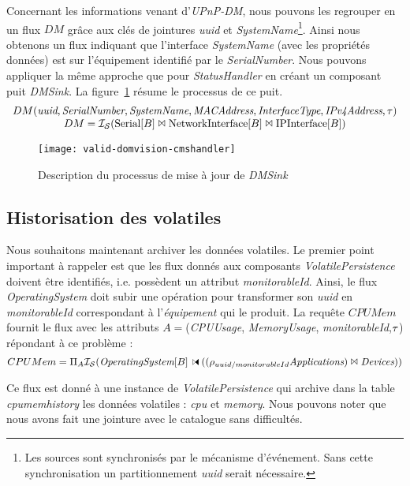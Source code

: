 Concernant les informations venant d'\textit{UPnP-DM}, nous pouvons les regrouper en un flux $DM$ grâce aux clés de jointures \textit{uuid} et \textit{SystemName}\footnote{Les sources sont synchronisés par le mécanisme d'événement. Sans cette synchronisation un partitionnement \textit{uuid} serait nécessaire.}. Ainsi nous obtenons un flux indiquant que l'interface \textit{SystemName} (avec les propriétés données) est sur l'équipement identifié par le \textit{SerialNumber}. Nous pouvons appliquer la même approche que pour \textit{StatusHandler} en créant un composant puit \textit{DMSink}. La figure~\ref{fig:valid:domvision:cmshandler} résume le processus de ce puit.
$$\begin{array}{c} DM(\textit{uuid},\textit{SerialNumber},\textit{SystemName},\textit{MACAddress},\textit{InterfaceType}, \textit{IPv4Address}, \tau)\\
 DM = \mathcal{I_S}(\textrm{Serial}[B] \Join \textrm{NetworkInterface}[B] \Join \textrm{IPInterface}[B])\end{array}$$
\begin{figure}[ht]
        \texttt{[image: valid-domvision-cmshandler]}
	\caption{Description du processus de mise à jour de \textit{DMSink}}\label{fig:valid:domvision:cmshandler}
\end{figure}

\subsection{Historisation des volatiles}
Nous souhaitons maintenant archiver les données volatiles. Le premier point important à rappeler est que les flux donnés aux composants \textit{VolatilePersistence} doivent être identifiés, i.e. possèdent un attribut \textit{monitorableId}. Ainsi, le flux \textit{OperatingSystem} doit subir une opération pour transformer son \textit{uuid} en \textit{monitorableId} correspondant à l'\textit{équipement} qui le produit. La requête $CPUMem$ fournit le flux avec les attributs $A=$(\textit{CPUUsage}, \textit{MemoryUsage}, \textit{monitorableId},$\tau$) répondant à ce problème :
$$CPUMem=\Pi_A \IS(\textit{OperatingSystem}[B]\ssjoin ((\rho_{uuid/monitorableId} \textit{Applications}) \Join \textit{Devices}))$$

Ce flux est donné à une instance de \textit{VolatilePersistence} qui archive dans la table \textit{cpumemhistory} les données volatiles : \textit{cpu} et \textit{memory}. Nous pouvons noter que nous avons fait une jointure avec le catalogue sans difficultés.

